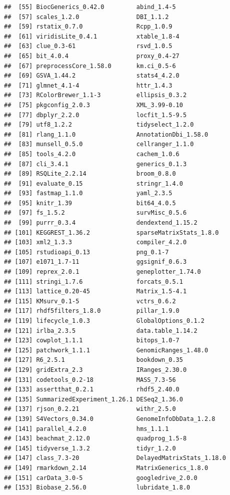 \documentclass[
  12pt,
]{book}
\begin{document}
\begin{verbatim}
##  [55] BiocGenerics_0.42.0         abind_1.4-5                
##  [57] scales_1.2.0                DBI_1.1.2                  
##  [59] rstatix_0.7.0               Rcpp_1.0.9                 
##  [61] viridisLite_0.4.1           xtable_1.8-4               
##  [63] clue_0.3-61                 rsvd_1.0.5                 
##  [65] bit_4.0.4                   proxy_0.4-27               
##  [67] preprocessCore_1.58.0       km.ci_0.5-6                
##  [69] GSVA_1.44.2                 stats4_4.2.0               
##  [71] glmnet_4.1-4                httr_1.4.3                 
##  [73] RColorBrewer_1.1-3          ellipsis_0.3.2             
##  [75] pkgconfig_2.0.3             XML_3.99-0.10              
##  [77] dbplyr_2.2.0                locfit_1.5-9.5             
##  [79] utf8_1.2.2                  tidyselect_1.2.0           
##  [81] rlang_1.1.0                 AnnotationDbi_1.58.0       
##  [83] munsell_0.5.0               cellranger_1.1.0           
##  [85] tools_4.2.0                 cachem_1.0.6               
##  [87] cli_3.4.1                   generics_0.1.3             
##  [89] RSQLite_2.2.14              broom_0.8.0                
##  [91] evaluate_0.15               stringr_1.4.0              
##  [93] fastmap_1.1.0               yaml_2.3.5                 
##  [95] knitr_1.39                  bit64_4.0.5                
##  [97] fs_1.5.2                    survMisc_0.5.6             
##  [99] purrr_0.3.4                 dendextend_1.15.2          
## [101] KEGGREST_1.36.2             sparseMatrixStats_1.8.0    
## [103] xml2_1.3.3                  compiler_4.2.0             
## [105] rstudioapi_0.13             png_0.1-7                  
## [107] e1071_1.7-11                ggsignif_0.6.3             
## [109] reprex_2.0.1                geneplotter_1.74.0         
## [111] stringi_1.7.6               forcats_0.5.1              
## [113] lattice_0.20-45             Matrix_1.5-4.1             
## [115] KMsurv_0.1-5                vctrs_0.6.2                
## [117] rhdf5filters_1.8.0          pillar_1.9.0               
## [119] lifecycle_1.0.3             GlobalOptions_0.1.2        
## [121] irlba_2.3.5                 data.table_1.14.2          
## [123] cowplot_1.1.1               bitops_1.0-7               
## [125] patchwork_1.1.1             GenomicRanges_1.48.0       
## [127] R6_2.5.1                    bookdown_0.35              
## [129] gridExtra_2.3               IRanges_2.30.0             
## [131] codetools_0.2-18            MASS_7.3-56                
## [133] assertthat_0.2.1            rhdf5_2.40.0               
## [135] SummarizedExperiment_1.26.1 DESeq2_1.36.0              
## [137] rjson_0.2.21                withr_2.5.0                
## [139] S4Vectors_0.34.0            GenomeInfoDbData_1.2.8     
## [141] parallel_4.2.0              hms_1.1.1                  
## [143] beachmat_2.12.0             quadprog_1.5-8             
## [145] tidyverse_1.3.2             tidyr_1.2.0                
## [147] class_7.3-20                DelayedMatrixStats_1.18.0  
## [149] rmarkdown_2.14              MatrixGenerics_1.8.0       
## [151] carData_3.0-5               googledrive_2.0.0          
## [153] Biobase_2.56.0              lubridate_1.8.0
\end{verbatim}
\end{document}
